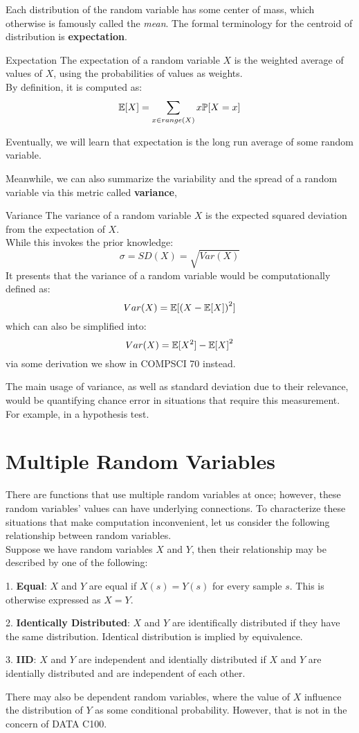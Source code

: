 Each distribution of the random variable has some center of mass, which otherwise is famously called the \textit{mean}. The formal terminology for the centroid of distribution is \textbf{expectation}. \\
\begin{ln-define}{Expectation}{}
    The expectation of a random variable $X$ is the weighted average of values of $X$, using the probabilities of values as weights. \\
    By definition, it is computed as:
    \[\mathbb{E}[X] = \sum_{x \in range(X)} x \mathbb{P}[X = x]\]
\end{ln-define}
Eventually, we will learn that expectation is the long run average of some random variable.

Meanwhile, we can also summarize the variability and the spread of a random variable via this metric called \textbf{variance},
\begin{ln-define}{Variance}{}
    The variance of a random variable $X$ is the expected squared deviation from the expectation of $X$. \\
    While this invokes the prior knowledge:
    \[\sigma = SD(X) = \sqrt{Var(X)}\]
    It presents that the variance of a random variable would be computationally defined as:
    \[Var(X) = \mathbb{E}[{(X - \mathbb{E}[X])}^2]\]
    which can also be simplified into:
    \[Var(X) = \mathbb{E}[X^2] - {\mathbb{E}[X]}^2\]
    via some derivation we show in COMPSCI 70 instead.
\end{ln-define}
The main usage of variance, as well as standard deviation due to their relevance, would be quantifying chance error in situations that require this measurement. For example, in a hypothesis test.

\section{Multiple Random Variables}
There are functions that use multiple random variables at once; however, these random variables' values can have underlying connections. To characterize these situations that make computation inconvenient, let us consider the following relationship between random variables. \\
Suppose we have random variables $X$ and $Y$, then their relationship may be described by one of the following:
\begin{bindenum}
    \item [1.] \textbf{Equal}: $X$ and $Y$ are equal if $X(s) = Y(s)$ for every sample $s$. This is otherwise expressed as $X = Y$.
    \item [2.] \textbf{Identically Distributed}: $X$ and $Y$ are identifically distributed if they have the same distribution. Identical distribution is implied by equivalence.
    \item [3.] \textbf{IID}: $X$ and $Y$ are independent and identially distributed if $X$ and $Y$ are identially distributed and are independent of each other.
\end{bindenum}
There may also be dependent random variables, where the value of $X$ influence the distribution of $Y$ as some conditional probability. However, that is not in the concern of DATA C100.

